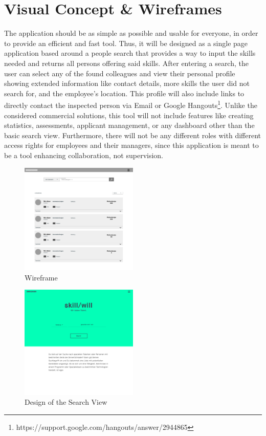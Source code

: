 \section{Visual Concept \& Wireframes}
The application should be as simple as possible and usable for everyone, in order to provide an efficient and fast tool. Thus, it will be designed as a single page application based around a people search that provides a way to input the skills needed and returns all persons offering said skills. After entering a search, the user can select any of the found colleagues and view their personal profile showing extended information like contact details, more skills the user did not search for, and the employee's location. This profile will also include links to directly contact the inspected person via Email or Google Hangouts\footnote{https://support.google.com/hangouts/answer/2944865}. Unlike the considered commercial solutions, this tool will not include features like creating statistics, assessments, applicant management, or any dashboard other than the basic search view.
Furthermore, there will not be any different roles with different access rights for employees and their managers, since this application is meant to be a tool enhancing collaboration, not supervision.
\begin{figure}[!htp]
    \centering
    \includegraphics[width=0.5\textwidth]{images/wireframe.png}
    \caption{Wireframe}
    \label{fig:wireframe}
\end{figure}

\begin{figure}[!htp]
    \centering
    \includegraphics[width=0.5\textwidth]{images/design_home.png}
    \caption[Home View Design]{Design of the Search View}
    \label{fig:design_home}
\end{figure}



